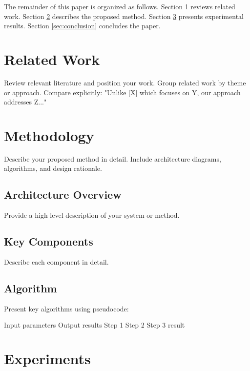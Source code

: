 \documentclass[10pt,conference]{IEEEtran}
\begin{document}
The remainder of this paper is organized as follows. Section \ref{sec:related} 
reviews related work. Section \ref{sec:method} describes the proposed method. 
Section \ref{sec:experiments} presents experimental results. Section 
\ref{sec:conclusion} concludes the paper.

\section{Related Work}
\label{sec:related}

Review relevant literature and position your work. Group related work by theme 
or approach. Compare explicitly: "Unlike [X] which focuses on Y, our approach 
addresses Z..."

\section{Methodology}
\label{sec:method}

Describe your proposed method in detail. Include architecture diagrams, 
algorithms, and design rationale.

\subsection{Architecture Overview}

Provide a high-level description of your system or method.

\subsection{Key Components}

Describe each component in detail.

\subsection{Algorithm}

Present key algorithms using pseudocode:

\begin{algorithm}
\caption{Algorithm Name}
\begin{algorithmic}[1]
\REQUIRE Input parameters
\ENSURE Output results
\STATE Step 1
\STATE Step 2
\STATE Step 3
\RETURN result
\end{algorithmic}
\end{algorithm}

\section{Experiments}
\label{sec:experiments}
\end{document}
